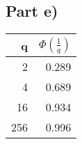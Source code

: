 \documentclass[10pt,a4paper]{article}
\begin{document}
\subsection*{Part e)}

\begin{tabular}{rr}
q & $\Phi\left(\frac{1}{q}\right)$\\
\hline
2 & 0.289\\
4 & 0.689\\
16 & 0.934\\
256 & 0.996\\
\end{tabular}
\begin{comment}
#+ORGTBL: SEND evaluations orgtbl-to-latex :splice nil :skip 0
|   q | $\Phi\left(\frac{1}{q}\right)$ |
|-----+--------------------------------|
|   2 |                          0.289 |
|   4 |                          0.689 |
|  16 |                          0.934 |
| 256 |                          0.996 |
\end{comment}
\end{document}
